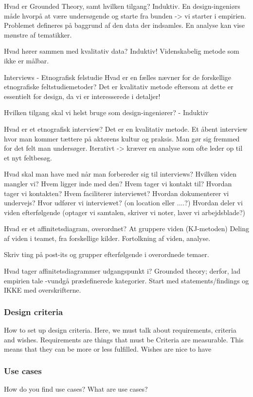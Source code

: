 Hvad er Grounded Theory, samt hvilken tilgang?
Induktiv. En design-ingeniørs måde hvorpå at være undersøgende og starte fra bunden -> vi starter i empirien.
Problemet defineres på baggrund af den data der indsamles. En analyse kan vise mønstre af tematikker.

Hvad hører sammen med kvalitativ data?
Induktiv! Videnskabelig metode som ikke er målbar.

Interviews - Etnografisk felstudie
Hvad er en fælles nævner for de forskellige etnografiske feltstudiemetoder?
Det er kvalitativ metode eftersom at dette er essentielt for design, da vi er interesserede i detaljer!

Hvilken tilgang skal vi helst bruge som design-ingeniører? - Induktiv

Hvad er et etnografisk interview?
Det er en kvalitativ metode.
Et åbent interview hvor man kommer tættere på aktørens kultur og praksis.
Man gør sig fremmed for det felt man undersøger.
Iterativt -> kræver en analyse som ofte leder op til et nyt feltbesøg.

Hvad skal man have med når man forbereder sig til interviews?
Hvilken viden mangler vi?
Hvem ligger inde med den?
Hvem tager vi kontakt til? Hvordan tager vi kontakten?
Hvem faciliterer interviewet?
Hvordan dokumenterer vi undervejs?
Hvor udfører vi interviewet? (on location eller ....?)
Hvordan deler vi viden efterfølgende (optager vi samtalen, skriver vi noter, laver vi arbejdsblade?)

Hvad er et affinitetsdiagram, overordnet?
At gruppere viden (KJ-metoden)
Deling af viden i teamet, fra forskellige kilder.
Fortolkning af viden, analyse.

Skriv ting på post-its og grupper efterfølgende i overordnede temaer.

Hvad tager affinitetsdiagrammer udgangspunkt i?
Grounded theory; derfor, lad empirien tale -vundgå prædefinerede kategorier.
Start med statements/findings og IKKE med overskrifterne.

\subsubsection{Design criteria}
How to set up design criteria.
Here, we must talk about requirements, criteria and wishes.
Requirements are things that must be
Criteria are measurable. This means that they can be more or less fulfilled.
Wishes are nice to have

\subsubsection{Use cases}
How do you find use cases? What are use cases?

